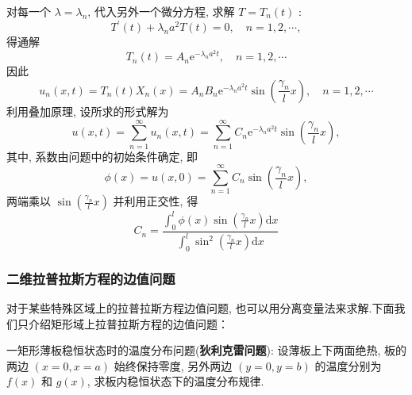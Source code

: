 对每一个 $ \lambda=\lambda_{n} $, 代入另外一个微分方程, 求解 $ T=T_{n}(t) $ :
$$
T^{\prime}(t)+\lambda_{n} a^{2} T(t)=0, \quad n=1,2, \cdots,
$$
得通解
$$
T_{n}(t)=A_{n} \mathrm{e}^{-\lambda_{n} a^{2} t}, \quad n=1,2, \cdots
$$
因此
$$
u_{n}(x, t)=T_{n}(t) X_{n}(x)=A_{n} B_{n} \mathrm{e}^{-\lambda_{n} a^{2} t} \sin \left(\frac{\gamma_{n}}{l} x\right), \quad n=1,2, \cdots
$$
利用叠加原理, 设所求的形式解为
$$
u(x, t)=\sum_{n=1}^{\infty} u_{n}(x, t)=\sum_{n=1}^{\infty} C_{n} \mathrm{e}^{-\lambda_{n} a^{2} t} \sin \left(\frac{\gamma_{n}}{l} x\right),
$$
其中, 系数由问题中的初始条件确定, 即
$$
\phi(x)=u(x, 0)=\sum_{n=1}^{\infty} C_{n} \sin \left(\frac{\gamma_{n}}{l} x\right),
$$
两端乘以 $ \sin \left(\frac{\gamma_{n}}{l} x\right) $ 并利用正交性, 得
$$
C_{n}=\frac{\int_{0}^{l} \phi(x) \sin \left(\frac{\gamma_{n}}{l} x\right) \mathrm{d} x}{\int_{0}^{l} \sin ^{2}\left(\frac{\gamma_{n}}{l} x\right) \mathrm{d} x}
$$


\subsubsection{二维拉普拉斯方程的边值问题}
对于某些特殊区域上的拉普拉斯方程边值问题, 也可以用分离变量法来求解.下面我们只介绍矩形域上拉普拉斯方程的边值问题：

一矩形薄板稳恒状态时的温度分布问题(\textbf{狄利克雷问题}): 设薄板上下两面绝热, 板的两边 $ (x=0, x=a) $ 始终保持零度, 另外两边 $ (y=0, y=b) $ 的温度分别为 $ f(x) $ 和 $ g(x) $, 求板内稳恒状态下的温度分布规律.

